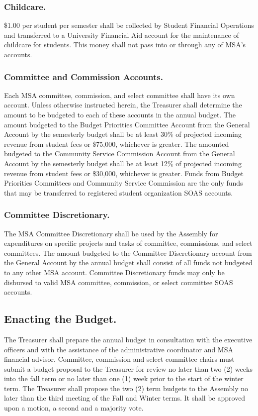 \subsubsection{Childcare.}
\$1.00 per student per semester shall be collected by Student Financial Operations and transferred to a University Financial Aid account for the maintenance of childcare for students.  This money shall not pass into or through any of MSA’s accounts.

\subsubsection{Committee and Commission Accounts.}
Each MSA committee, commission, and select committee shall have its own account.  Unless otherwise instructed herein, the Treasurer shall determine the amount to be budgeted to each of these accounts in the annual budget.
The amount budgeted to the Budget Priorities Committee Account from the General Account by the semesterly budget shall be at least 30\% of projected incoming revenue from student fees or \$75,000, whichever is greater.
The amounted budgeted to the Community Service Commission Account from the General Account by the semesterly budget shall be at least 12\% of projected incoming revenue from student fees or \$30,000, whichever is greater.
\subsubsubsection{}
Funds from Budget Priorities Committees and Community Service Commission are the only funds that may be transferred to registered student organization SOAS accounts.

\subsubsection{Committee Discretionary.}
The MSA Committee Discretionary shall be used by the Assembly for expenditures on specific projects and tasks of committee, commissions, and select committees. The amount budgeted to the Committee Discretionary account from the General Account by the annual budget shall consist of all funds not budgeted to any other MSA account. Committee Discretionary funds may only be disbursed to valid MSA committee, commission, or select committee SOAS accounts.

\subsection{Enacting the Budget.}
The Treasurer shall prepare the annual budget in consultation with the executive officers and with the assistance of the administrative coordinator and MSA financial advisor. Committee, commission and select committee chairs must submit a budget proposal to the Treasurer for review no later than two (2) weeks into the fall term or no later than one (1) week prior to the start of the winter term. The Treasurer shall propose the two (2) term budgets to the Assembly no later than the third meeting of the Fall and Winter terms. It shall be approved upon a motion, a second and a majority vote.

